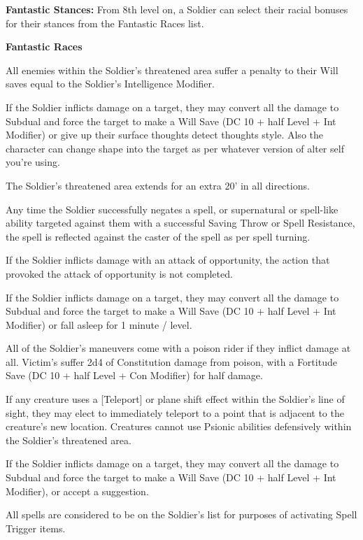 \textbf{Fantastic Stances:} From 8th level on, a Soldier can select their racial bonuses for their stances from the Fantastic Races list.

\textbf{Fantastic Races}
\begin{description*}
\item[Beefolk:] All enemies within the Soldier's threatened area suffer a penalty to their Will saves equal to the Soldier's Intelligence Modifier.
\item[Doppelg\:{a}nger:] If the Soldier inflicts damage on a target, they may convert all the damage to Subdual and force the target to make a Will Save (DC 10 + half Level + Int Modifier) or give up their surface thoughts detect thoughts style. Also the character can change shape into the target as per whatever version of alter self you're using.
\item[Kyton:] The Soldier's threatened area extends for an extra 20' in all directions.
\item[Nerra:] Any time the Soldier successfully negates a spell, or supernatural or spell-like ability targeted against them with a successful Saving Throw or Spell Resistance, the spell is reflected against the caster of the spell as per spell turning.
\item[Ogre:] If the Soldier inflicts damage with an attack of opportunity, the action that provoked the attack of opportunity is not completed.
\item[Pixie:] If the Soldier inflicts damage on a target, they may convert all the damage to Subdual and force the target to make a Will Save (DC 10 + half Level + Int Modifier) or fall asleep for 1 minute / level.
\item[Snakefolk:] All of the Soldier's maneuvers come with a poison rider if they inflict damage at all. Victim's suffer 2d4 of Constitution damage from poison, with a Fortitude Save (DC 10 + half Level + Con Modifier) for half damage.
\item[Starfolk:] If any creature uses a [Teleport] or plane shift effect within the Soldier's line of sight, they may elect to immediately teleport to a point that is adjacent to the creature's new location. Creatures cannot use Psionic abilities defensively within the Soldier's threatened area.
\item[Succubus:] If the Soldier inflicts damage on a target, they may convert all the damage to Subdual and force the target to make a Will Save (DC 10 + half Level + Int Modifier), or accept a suggestion.
\item[Yakfolk:] All spells are considered to be on the Soldier's list for purposes of activating Spell Trigger items.
\end{description*}

